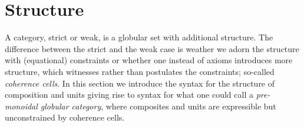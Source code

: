 \section{Structure}
\label{sec:structure}



A category, strict or weak, is a globular set with additional
structure. The difference between the strict and the weak case is weather
we adorn the structure with (equational) constraints or whether one instead
of axioms introduces more structure, which witnesses rather than postulates
the constraints; so-called \emph{coherence cells}. In this section we
introduce the syntax for the structure of composition and units
giving rise to syntax for what one could call a \emph{pre-monoidal
  globular category}, where composites and units are expressible but
unconstrained by coherence cells.

